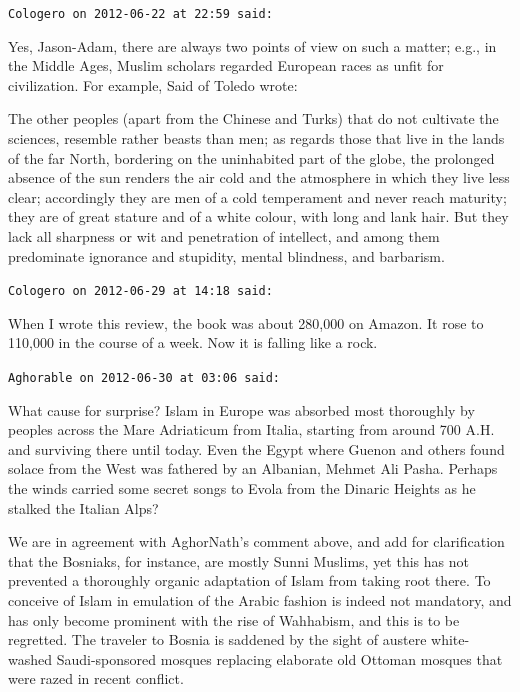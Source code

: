 \begin{footnotesize}
\begin{sffamily}
\texttt{Cologero on 2012-06-22 at 22:59 said:}

Yes, Jason-Adam, there are always two points of view on such a matter; e.g., in the Middle Ages, Muslim scholars regarded European races as unfit for civilization. For example, Said of Toledo wrote:

\begin{quotex}\footnotesize

The other peoples (apart from the Chinese and Turks) that do not cultivate the sciences, resemble rather beasts than men; as regards those that live in the lands of the far North, bordering on the uninhabited part of the globe, the prolonged absence of the sun renders the air cold and the atmosphere in which they live less clear; accordingly they are men of a cold temperament and never reach maturity; they are of great stature and of a white colour, with long and lank hair. But they lack all sharpness or wit and penetration of intellect, and among them predominate ignorance and stupidity, mental blindness, and barbarism.
\end{quotex}


\hfill

\texttt{Cologero on 2012-06-29 at 14:18 said:}

When I wrote this review, the book was about 280,000 on Amazon. It rose to 110,000 in the course of a week. Now it is falling like a rock.

\hfill

\texttt{Aghorable on 2012-06-30 at 03:06 said:}

What cause for surprise? Islam in Europe was absorbed most thoroughly by peoples across the Mare Adriaticum from Italia, starting from around 700 A.H. and surviving there until today. Even the Egypt where Guenon and others found solace from the West was fathered by an Albanian, Mehmet Ali Pasha. Perhaps the winds carried some secret songs to Evola from the Dinaric Heights as he stalked the Italian Alps?

We are in agreement with AghorNath's comment above, and add for clarification that the Bosniaks, for instance, are mostly Sunni Muslims, yet this has not prevented a thoroughly organic adaptation of Islam from taking root there. To conceive of Islam in emulation of the Arabic fashion is indeed not mandatory, and has only become prominent with the rise of Wahhabism, and this is to be regretted. The traveler to Bosnia is saddened by the sight of austere white-washed Saudi-sponsored mosques replacing elaborate old Ottoman mosques that were razed in recent conflict.


\end{sffamily}
\end{footnotesize}
